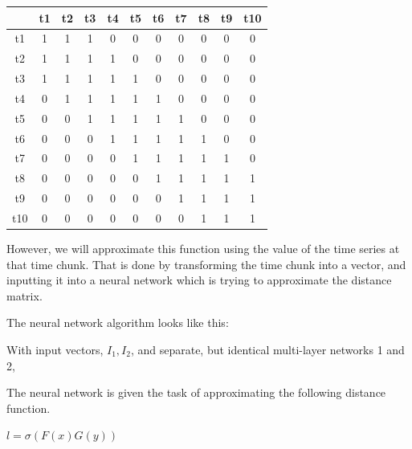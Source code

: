 \documentclass{article}
\begin{document}
\begin{tabular}{|c|c|c|c|c|c|c|c|c|c|c|}
	\hline 
	& t1 & t2 & t3 & t4 & t5 & t6 & t7 & t8 & t9 & t10\\ \hline 
	t1 & 1 & 1 & 1 & 0 & 0 & 0 & 0 & 0 & 0 & 0\\ \hline 
	t2 & 1 & 1 & 1 & 1 & 0 & 0 & 0 & 0 & 0 & 0\\ \hline 
	t3 & 1 & 1 & 1 & 1 & 1 & 0 & 0 & 0 & 0 & 0\\ \hline 
	t4 & 0 & 1 & 1 & 1 & 1 & 1 & 0 & 0 & 0 & 0\\ \hline 
	t5 & 0 & 0 & 1 & 1 & 1 & 1 & 1 & 0 & 0 & 0\\ \hline 
	t6 & 0 & 0 & 0 & 1 & 1 & 1 & 1 & 1 & 0 & 0\\ \hline 
	t7 & 0 & 0 & 0 & 0 & 1 & 1 & 1 & 1 & 1 & 0\\ \hline 
	t8 & 0 & 0 & 0 & 0 & 0 & 1 & 1 & 1 & 1 & 1\\ \hline 
	t9 & 0 & 0 & 0 & 0 & 0 & 0 & 1 & 1 & 1 & 1\\ \hline 
	t10 & 0 & 0 & 0 & 0 & 0 & 0 & 0 & 1 & 1 & 1\\ \hline 
\end{tabular}

However, we will approximate this function using the value of the time series at that time chunk. That is done by transforming the time chunk into a vector, and inputting it into a neural network which is trying to approximate the distance matrix. 

The neural network algorithm looks like this:

With input vectors, $I_1, I_2$, and separate, but identical multi-layer networks 1 and 2, 	


%


The neural network is given the task of approximating the following distance function. 


$l = \sigma(F(x) G(y))$


{}

\end{document}
